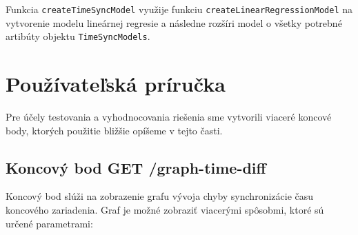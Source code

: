 Funkcia \texttt{createTimeSyncModel} využije funkciu \texttt{createLinearRegressionModel} na vytvorenie modelu lineárnej regresie a následne rozšíri model o všetky potrebné artibúty objektu \texttt{TimeSyncModels}.




\section{Používateľská príručka}

Pre účely testovania a vyhodnocovania riešenia sme vytvorili viaceré koncové body, ktorých použitie bližšie opíšeme v tejto časti.

\subsection{Koncový bod GET /graph-time-diff}

Koncový bod slúži na zobrazenie grafu vývoja chyby synchronizácie času koncového zariadenia.
Graf je možné zobraziť viacerými spôsobmi, ktoré sú určené parametrami:

